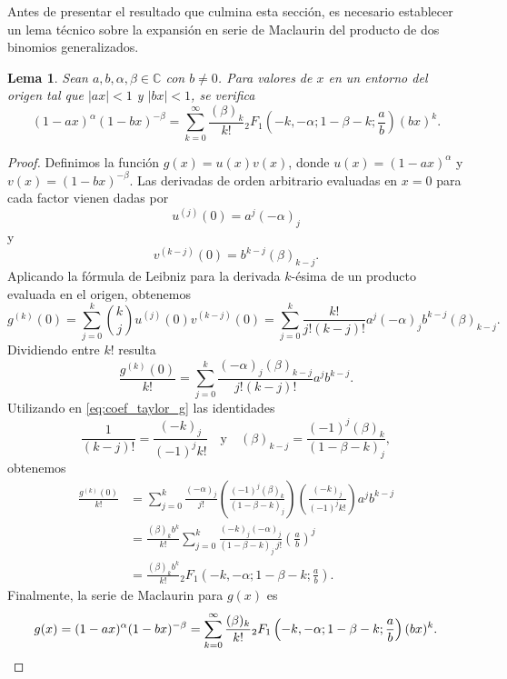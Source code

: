 \documentclass[12pt,a4paper]{book}
\newtheorem{lemma}[theorem]{Lema}
\begin{document}
Antes de presentar el resultado que culmina esta sección, es necesario establecer un lema técnico sobre la expansión en serie de Maclaurin del producto de dos binomios generalizados. 

\begin{lemma}
\label{lema:expansion_producto_binomios}
Sean $a, b, \alpha, \beta \in \mathbb{C}$ con $b \neq 0$. Para valores de $x$ en un entorno del origen tal que $|ax| < 1$ y $|bx| < 1$, se verifica 
\[
    (1-ax)^\alpha (1-bx)^{-\beta} = \sum_{k=0}^{\infty} \frac{(\beta)_k}{k!} {}_{2}F_{1}\left(-k, -\alpha; 1-\beta-k; \frac{a}{b}\right) (bx)^k.
\]
\end{lemma}

\begin{proof}
Definimos la función $g(x) = u(x)v(x)$, donde $u(x) = (1-ax)^\alpha$ y $v(x) = (1-bx)^{-\beta}$. 
Las derivadas de orden arbitrario evaluadas en $x=0$ para cada factor vienen dadas por
\[
u^{(j)}(0) = a^j (-\alpha)_j
\]
y
\[
v^{(k-j)}(0) = b^{k-j} (\beta)_{k-j}.
\]
Aplicando la fórmula de Leibniz para la derivada $k$-ésima de un producto evaluada en el origen, obtenemos
\[
    g^{(k)}(0) = \sum_{j=0}^{k} \binom{k}{j} u^{(j)}(0) v^{(k-j)}(0) = \sum_{j=0}^{k} \frac{k!}{j!(k-j)!} a^j (-\alpha)_j b^{k-j} (\beta)_{k-j}.
\]
Dividiendo entre $k!$ resulta
\begin{equation}
\label{eq:coef_taylor_g}
    \frac{g^{(k)}(0)}{k!} = \sum_{j=0}^{k} \frac{(-\alpha)_j (\beta)_{k-j}}{j!(k-j)!} a^j b^{k-j}.
\end{equation}
Utilizando en \eqref{eq:coef_taylor_g} las identidades
\[
    \frac{1}{(k-j)!} = \frac{(-k)_j}{(-1)^j k!} \quad \text{y} \quad (\beta)_{k-j} = \frac{(-1)^j (\beta)_k}{(1-\beta-k)_j},
\]
obtenemos
\begin{align*}
    \frac{g^{(k)}(0)}{k!} &= \sum_{j=0}^{k} \frac{(-\alpha)_j}{j!} \left( \frac{(-1)^j (\beta)_k}{(1-\beta-k)_j} \right) \left( \frac{(-k)_j}{(-1)^j k!} \right) a^j b^{k-j} \\
    &= \frac{(\beta)_k b^k}{k!} \sum_{j=0}^{k} \frac{(-k)_j (-\alpha)_j}{(1-\beta-k)_j \, j!} \left(\frac{a}{b}\right)^j \\
    &= \frac{(\beta)_k b^k}{k!} {}_{2}F_{1}\left(-k, -\alpha; 1-\beta-k; \frac{a}{b}\right).
\end{align*}
Finalmente, la serie de Maclaurin para $g(x)$ es
\[
g(x) = (1-ax)^\alpha (1-bx)^{-\beta} = \sum_{k=0}^{\infty} \frac{(\beta)_k}{k!} {}_{2}F_{1}\left(-k, -\alpha; 1-\beta-k; \frac{a}{b}\right) (bx)^k.
\qedhere
\]
\end{proof}
\end{document}
